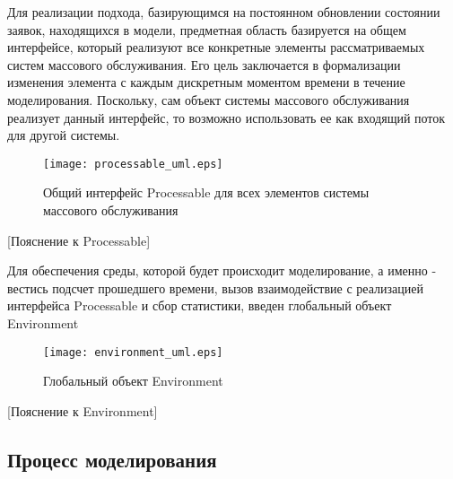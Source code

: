 Для реализации подхода, базирующимся на постоянном обновлении состоянии заявок, находящихся в модели, предметная область базируется на общем интерфейсе, который реализуют все конкретные элементы рассматриваемых систем массового обслуживания. Его цель заключается в формализации изменения элемента  с каждым дискретным моментом времени в течение моделирования. Поскольку, сам объект системы массового обслуживания реализует данный интерфейс, то возможно использовать ее как входящий поток для другой системы.
\begin{figure}[H]
	\centering
	\texttt{[image: processable\_uml.eps]}
	\caption{Общий интерфейс Processable для всех элементов системы массового обслуживания}
	\label{processable_uml}
\end{figure}
[Пояснение к Processable]

Для обеспечения среды, которой будет происходит моделирование, а именно - вестись подсчет прошедшего времени, вызов взаимодействие с реализацией интерфейса Processable и сбор статистики, введен глобальный объект Environment
\begin{figure}[H]
	\centering
	\texttt{[image: environment\_uml.eps]}
	\caption{Глобальный объект Environment}
	\label{environment_uml}
\end{figure}
[Пояснение к Environment]

\subsection{Процесс моделирования}